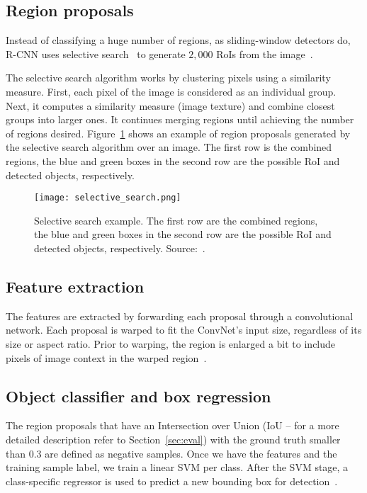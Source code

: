 \subsection{Region proposals}
%
Instead of classifying a huge number of regions, as sliding-window detectors do,
R-CNN uses selective search~\cite{Uijlings2013ss} to generate $2,000$ RoIs from the image~\cite{Girshick2016RCNN}.

The selective search algorithm works by clustering pixels using a similarity measure.
First, each pixel of the image is considered as an individual group.
Next, it computes a similarity measure (\eg image texture) and combine closest groups into larger ones.
It continues merging regions until achieving the number of regions desired.
Figure~\ref{fig:selective_seach} shows an example of region proposals generated by the selective search algorithm over an image.
The first row is the combined regions, the blue and green boxes in the second row are the possible RoI and detected objects, respectively.
%
\begin{figure}[bh!]
	\centering
	\texttt{[image: selective\_search.png]}
	\caption[Selective search example.]{Selective search example.
	The first row are the combined regions, the blue and green boxes in the second row are the possible RoI and detected objects, respectively.
	Source:~\cite{Uijlings2013ss}.}
	\label{fig:selective_seach}
\end{figure}

\subsection{Feature extraction}
%
The features are extracted by forwarding each proposal through a convolutional network.
Each proposal is warped to fit the ConvNet's input size, regardless of its size or aspect ratio.
Prior to warping, the region is enlarged a bit to include pixels of image context in the warped region~\cite{Girshick2014rich}.

\subsection{Object classifier and box regression}
%
The region proposals that have an Intersection over Union (IoU -- for a more detailed description refer to Section~\ref{sec:eval}) with the ground truth smaller than $0.3$ are defined as negative samples.
Once we have the features and the training sample label, we train a linear SVM per class.
After the SVM stage, a class-specific regressor is used to predict a new bounding box for detection~\cite{Girshick2014rich}.


